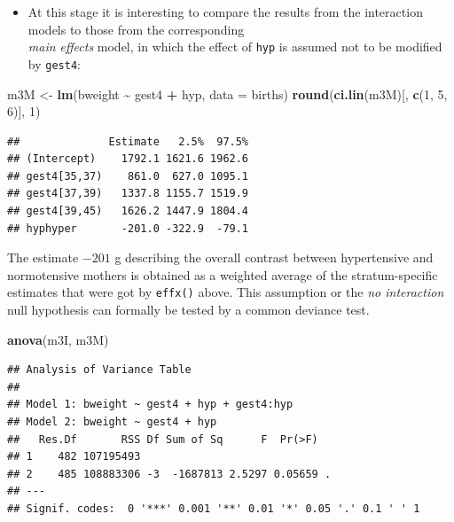 \documentclass[
]{book}
\newenvironment{Shaded}{\begin{snugshade}}{\end{snugshade}}
\newcommand{\AttributeTok}[1]{\textcolor[rgb]{0.13,0.29,0.53}{#1}}
\newcommand{\DecValTok}[1]{\textcolor[rgb]{0.00,0.00,0.81}{#1}}
\newcommand{\FunctionTok}[1]{\textcolor[rgb]{0.13,0.29,0.53}{\textbf{#1}}}
\newcommand{\NormalTok}[1]{#1}
\newcommand{\OtherTok}[1]{\textcolor[rgb]{0.56,0.35,0.01}{#1}}
\newcommand{\SpecialCharTok}[1]{\textcolor[rgb]{0.81,0.36,0.00}{\textbf{#1}}}
\providecommand{\tightlist}{%
  \setlength{\itemsep}{0pt}\setlength{\parskip}{0pt}}
\begin{document}
\begin{itemize}
\tightlist
\item
  At this stage it is interesting to compare the results from the
  interaction models to those from the corresponding\\
  \emph{main effects} model, in which the effect of \texttt{hyp}
  is assumed not to be modified by \texttt{gest4}:
\end{itemize}

\begin{Shaded}
\begin{Highlighting}[]
\NormalTok{m3M }\OtherTok{\textless{}{-}} \FunctionTok{lm}\NormalTok{(bweight }\SpecialCharTok{\textasciitilde{}}\NormalTok{ gest4 }\SpecialCharTok{+}\NormalTok{ hyp, }\AttributeTok{data =}\NormalTok{ births)}
\FunctionTok{round}\NormalTok{(}\FunctionTok{ci.lin}\NormalTok{(m3M)[, }\FunctionTok{c}\NormalTok{(}\DecValTok{1}\NormalTok{, }\DecValTok{5}\NormalTok{, }\DecValTok{6}\NormalTok{)], }\DecValTok{1}\NormalTok{)}
\end{Highlighting}
\end{Shaded}

\begin{verbatim}
##              Estimate   2.5%  97.5%
## (Intercept)    1792.1 1621.6 1962.6
## gest4[35,37)    861.0  627.0 1095.1
## gest4[37,39)   1337.8 1155.7 1519.9
## gest4[39,45)   1626.2 1447.9 1804.4
## hyphyper       -201.0 -322.9  -79.1
\end{verbatim}

The estimate \(-201\) g describing the overall contrast
between hypertensive and normotensive mothers is obtained
as a weighted average of the stratum-specific estimates
that were got by \texttt{effx()} above.
This assumption or the
\emph{no interaction} null hypothesis can formally be tested by a common deviance test.

\begin{Shaded}
\begin{Highlighting}[]
\FunctionTok{anova}\NormalTok{(m3I, m3M)}
\end{Highlighting}
\end{Shaded}

\begin{verbatim}
## Analysis of Variance Table
## 
## Model 1: bweight ~ gest4 + hyp + gest4:hyp
## Model 2: bweight ~ gest4 + hyp
##   Res.Df       RSS Df Sum of Sq      F  Pr(>F)  
## 1    482 107195493                              
## 2    485 108883306 -3  -1687813 2.5297 0.05659 .
## ---
## Signif. codes:  0 '***' 0.001 '**' 0.01 '*' 0.05 '.' 0.1 ' ' 1
\end{verbatim}
\end{document}

